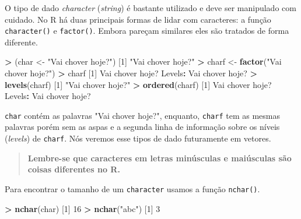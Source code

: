 \documentclass[]{book}
\newenvironment{Shaded}{\begin{snugshade}}{\end{snugshade}}
\newcommand{\KeywordTok}[1]{\textcolor[rgb]{0.13,0.29,0.53}{\textbf{#1}}}
\newcommand{\DecValTok}[1]{\textcolor[rgb]{0.00,0.00,0.81}{#1}}
\newcommand{\StringTok}[1]{\textcolor[rgb]{0.31,0.60,0.02}{#1}}
\newcommand{\OperatorTok}[1]{\textcolor[rgb]{0.81,0.36,0.00}{\textbf{#1}}}
\newcommand{\NormalTok}[1]{#1}
\begin{document}
O tipo de dado \emph{character} (\emph{string}) é bastante utilizado e
deve ser manipulado com cuidado. No R há duas principais formas de lidar
com caracteres: a função \texttt{character()} e \texttt{factor()}.
Embora pareçam similares eles são tratados de forma diferente.

\begin{Shaded}
\begin{Highlighting}[]
\OperatorTok{>}\StringTok{ }\NormalTok{(char <-}\StringTok{ "Vai chover hoje?"}\NormalTok{)}
\NormalTok{[}\DecValTok{1}\NormalTok{] }\StringTok{"Vai chover hoje?"}
\OperatorTok{>}\StringTok{ }\NormalTok{charf <-}\StringTok{ }\KeywordTok{factor}\NormalTok{(}\StringTok{"Vai chover hoje?"}\NormalTok{)}
\OperatorTok{>}\StringTok{ }\NormalTok{charf}
\NormalTok{[}\DecValTok{1}\NormalTok{] Vai chover hoje?}
\NormalTok{Levels}\OperatorTok{:}\StringTok{ }\NormalTok{Vai chover hoje?}
\OperatorTok{>}\StringTok{ }\KeywordTok{levels}\NormalTok{(charf)}
\NormalTok{[}\DecValTok{1}\NormalTok{] }\StringTok{"Vai chover hoje?"}
\OperatorTok{>}\StringTok{ }\KeywordTok{ordered}\NormalTok{(charf)}
\NormalTok{[}\DecValTok{1}\NormalTok{] Vai chover hoje?}
\NormalTok{Levels}\OperatorTok{:}\StringTok{ }\NormalTok{Vai chover hoje?}
\end{Highlighting}
\end{Shaded}

\texttt{char} contém as palavras "Vai chover hoje?", enquanto,
\texttt{charf} tem as mesmas palavras porém sem as aspas e a segunda
linha de informação sobre os níveis (\emph{levels}) de \texttt{charf}.
Nós veremos esse tipos de dado futuramente em vetores.

\begin{quote}
\textbf{Lembre-se que caracteres em letras minúsculas e maiúsculas são
coisas diferentes no R.}
\end{quote}

Para encontrar o tamanho de um \texttt{character} usamos a função
\texttt{nchar()}.

\begin{Shaded}
\begin{Highlighting}[]
\OperatorTok{>}\StringTok{ }\KeywordTok{nchar}\NormalTok{(char)}
\NormalTok{[}\DecValTok{1}\NormalTok{] }\DecValTok{16}
\OperatorTok{>}\StringTok{ }\KeywordTok{nchar}\NormalTok{(}\StringTok{"abc"}\NormalTok{)}
\NormalTok{[}\DecValTok{1}\NormalTok{] }\DecValTok{3}
\end{Highlighting}
\end{Shaded}
\end{document}
